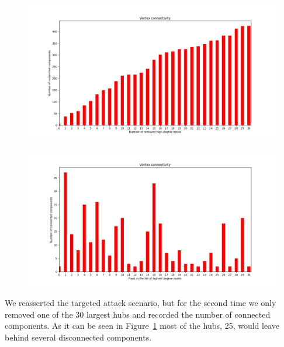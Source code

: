\documentclass[runningheads]{llncs}
\begin{document}
\begin{figure}[h]
	\centering
	\begin{minipage}{.5\textwidth}
		\centering
		\includegraphics[width=\linewidth]{vertexConnectivity.png}
		\label{fig:vertexconnectivity}
	\end{minipage}%
	\begin{minipage}{.5\textwidth}
		\centering
		\includegraphics[width=\linewidth]{vertexConnectivity1Removed.png}
		\label{fig:vertecconnectivity1removed}
	\end{minipage}
\end{figure}

We reasserted the targeted attack scenario, but for the second time we only removed one of the $30$ largest hubs and recorded the number of connected components. As it can be seen in Figure~\ref{fig:vertecconnectivity1removed} most of the hubs, 25, would leave behind several disconnected components.
\end{document}
